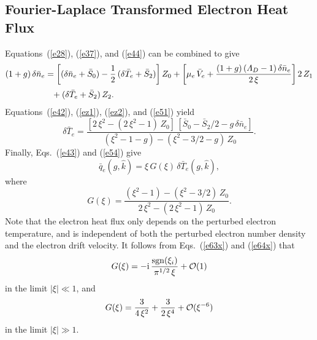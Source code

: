 \documentclass[12pt,prb,aps]{revtex4-1}
\begin{document}
\subsection{Fourier-Laplace Transformed Electron Heat Flux}
Equations~(\ref{e28}), (\ref{e37}), and (\ref{e44}) can be combined to give
\begin{align}\label{e51}
(1+g)\,\delta\bar{n}_e&=\left[(\delta\bar{n}_e+\bar{S}_0)-\frac{1}{2}\,(\delta\bar{T}_e+\bar{S}_2)\right]Z_0+\left[\mu_e\,\bar{V}_e+\frac{(1+g)\,({\mit\Lambda}_D-1)\,\delta\bar{n}_e}{2\,\xi}\right]2\,Z_1\nonumber\\[0.5ex]
&\phantom{=}
+(\delta\bar{T}_e+\bar{S}_2)\,Z_2.
\end{align}
Equations~(\ref{e42}), (\ref{ez1}), (\ref{ez2}), and (\ref{e51})
yield
\begin{equation}\label{e54}
\delta\bar{T}_e = \frac{[2\,\xi^2-(2\,\xi^2-1)\,Z_0]\,[\bar{S}_0-\bar{S}_2/2-g\,\delta\bar{n}_e]}{
(\xi^2-1-g)-(\xi^2-3/2-g)\,Z_0}.
\end{equation}
Finally, Eqs.~(\ref{e43}) and (\ref{e54}) give\,\cite{haz}
\begin{equation}\label{e55}
\bar{q}_e(g,\hat{k}) = \xi\,G(\xi)\,\delta\bar{T}_e(g,\hat{k}),
\end{equation}
where
\begin{equation}\label{e56}
G(\xi) = \frac{(\xi^2-1)-(\xi^2-3/2)\,Z_0}{2\,\xi^2-(2\,\xi^2-1)\,Z_0}.
\end{equation}
Note that the electron heat flux only depends on the perturbed electron temperature, and is independent of both the
perturbed electron number density and the electron drift velocity. 
It follows from Eqs.~(\ref{e63x}) and (\ref{e64x}) that
\begin{equation}\label{lmfp}
G(\xi) =-{\rm i}\,\frac{{\rm sgn}(\xi_i)}{\pi^{1/2}\,\xi}+{\cal O}(1)
\end{equation}
in the limit $|\xi|\ll 1$, and 
\begin{equation}\label{smfp}
G(\xi)= \frac{3}{4\,\xi^2} + \frac{3}{2\,\xi^4} + {\cal O}(\xi^{-6}) 
\end{equation}
in the limit $|\xi|\gg 1$. 
\end{document}
